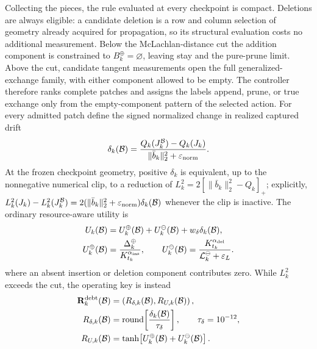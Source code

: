 \documentclass[
  reprint,
  amsmath,
  amssymb,
  aps,
  pra,
  nofootinbib,
  superscriptaddress,
  floatfix
]{revtex4-2}
\newcommand{\eps}{\varepsilon}
\begin{document}
Collecting the pieces, the rule evaluated at every checkpoint is compact.  Deletions are always eligible: a candidate deletion is a row and column selection of geometry already acquired for propagation, so its structural evaluation costs no additional measurement.  Below the McLachlan-distance cut the addition component is constrained to $B_k^{\oplus}=\varnothing$, leaving stay and the pure-prune limit.  Above the cut, candidate tangent measurements open the full generalized-exchange family, with either component allowed to be empty.  The controller therefore ranks complete patches and assigns the labels append, prune, or true exchange only from the empty-component pattern of the selected action.  For every admitted patch define the signed normalized change in realized captured drift
\begin{equation}
\delta_k(\mathcal B)
=
\frac{Q_k(J_k^{\mathcal B})-Q_k(J_k)}
{\|\bar b_k\|_2^2+\eps_{\rm norm}}.
\label{eq:signed_patch_drift}
\end{equation}
At the frozen checkpoint geometry, positive $\delta_k$ is equivalent, up to the nonnegative numerical clip, to a reduction of
$L_k^2=2[\|\bar b_k\|_2^2-Q_k]_+$; explicitly,
$L_k^2(J_k)-L_k^2(J_k^{\mathcal B})=2(\|\bar b_k\|_2^2+\eps_{\rm norm})\delta_k(\mathcal B)$ whenever the clip is inactive.  The ordinary resource-aware utility is
\begin{equation}
\begin{aligned}
U_k(\mathcal B)
&=U_k^{\oplus}(\mathcal B)+U_k^{\ominus}(\mathcal B)
+w_\delta\delta_k(\mathcal B),\\
U_k^{\oplus}(\mathcal B)
&=\frac{\Delta_k^{\oplus}}{K_{t_k}^{\alpha_{\rm ins}}},
\qquad
U_k^{\ominus}(\mathcal B)
=\frac{K_{t_k}^{\alpha_{\rm del}}}{\mathcal L_k^{\ominus}+\eps_L}.
\end{aligned}
\label{eq:operating_score}
\end{equation}
where an absent insertion or deletion component contributes zero.  While $L_k^2$ exceeds the cut, the operating key is instead
\begin{equation}
\begin{aligned}
\mathbf R_k^{\rm debt}(\mathcal B)
&=\left(R_{\delta,k}(\mathcal B),R_{U,k}(\mathcal B)\right),\\
R_{\delta,k}(\mathcal B)
&=\operatorname{round}\!\left[\frac{\delta_k(\mathcal B)}{\tau_\delta}\right],
\qquad \tau_\delta=10^{-12},\\
R_{U,k}(\mathcal B)
&=\tanh\!\left[U_k^{\oplus}(\mathcal B)+U_k^{\ominus}(\mathcal B)\right].
\end{aligned}
\label{eq:debt_score}
\end{equation}
\end{document}
